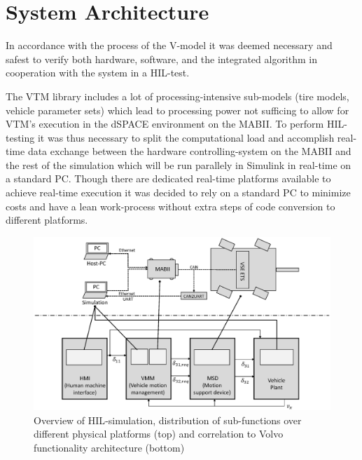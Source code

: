 \documentclass[root.tex]{subfiles}
\begin{document}
{\pagestyle{empty}}
\section{System Architecture}
\label{chap:HiL-Architecture}



In accordance with the process of the V-model\cite{automotive_software_engineering} it was deemed necessary and safest to verify both hardware, software, and the integrated algorithm in cooperation with the system in a \gls{HIL}-test. 

The \gls{VTM} library includes a lot of processing-intensive sub-models (tire models, vehicle parameter sets) which lead to processing power not sufficing to allow for \gls{VTM}'s execution in the dSPACE environment on the \gls{MABII}. To perform \gls{HIL}-testing it was thus necessary to split the computational load and accomplish real-time data exchange between the hardware controlling-system on the \gls{MABII} and the rest of the simulation which will be run parallely in Simulink in real-time on a standard PC. Though there are dedicated real-time platforms available to achieve real-time execution it was decided to rely on a standard PC to minimize costs and have a lean work-process without extra steps of code conversion to different platforms.


\begin{figure}[tb]
	\centering
	\includegraphics[width=0.8\linewidth]{HIL_overview}
	\caption[Overview of \acrlong{HIL}-simulation, distribution of sub-functions over different physical platforms (top) and correlation to Volvo functionality architecture (bottom)]{Overview of \gls{HIL}-simulation, distribution of sub-functions over different physical platforms (top) and correlation to Volvo functionality architecture (bottom)}
	
	\label{fig:HIL_overview}
\end{figure}
\end{document}
